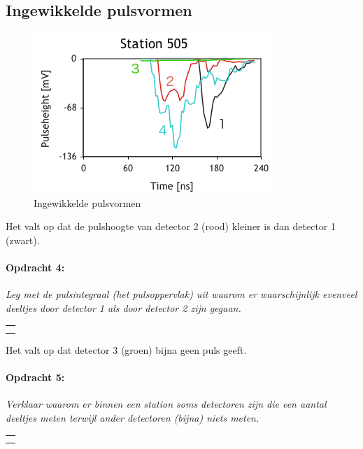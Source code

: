 \subsection{Ingewikkelde pulsvormen}

\begin{figure}[h]
\noindent \begin{centering}
\includegraphics[scale=0.65]{Figures/Traces505}
\par\end{centering}

\caption{\label{fig:Ingewikkelde-pulsvormen}Ingewikkelde pulsvormen}
\end{figure}


\bigskip{}


Het valt op dat de pulshoogte van detector 2 (rood) kleiner is dan
detector 1 (zwart).

\begin{minipage}[t]{1\columnwidth}%

\paragraph{Opdracht 4:}

\textit{Leg met de pulsintegraal (het pulsoppervlak) uit waarom er
waarschijnlijk evenveel deeltjes door detector 1 als door detector
2 zijn gegaan.}

\begin{tabular}{>{\raggedright}p{16.6cm}}
\tabularnewline
\hline 
\tabularnewline
\hline 
\tabularnewline
\hline 
\tabularnewline
\hline 
\end{tabular}%
\end{minipage}

\bigskip{}


Het valt op dat detector 3 (groen) bijna geen puls geeft.

\begin{minipage}[t]{1\columnwidth}%

\paragraph{Opdracht 5:}

\textit{Verklaar waarom er binnen een station soms detectoren zijn
die een aantal deeltjes meten terwijl ander detectoren (bijna) niets
meten.}

\begin{tabular}{>{\raggedright}p{16.6cm}}
\tabularnewline
\hline 
\tabularnewline
\hline 
\tabularnewline
\hline 
\tabularnewline
\hline 
\end{tabular}%
\end{minipage}

